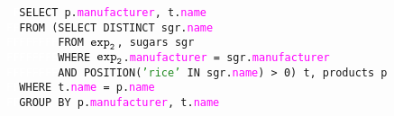 \newcommand{\sqlcolor}[1]{\textcolor{Bittersweet}{#1}}
\newcommand{\fieldcolor}[1]{\textcolor{Fuchsia}{#1}}
\newcommand{\strcolor}[1]{\textcolor{ForestGreen}{#1}}
\newcommand{\numcolor}[1]{\textcolor{TealBlue}{#1}}

\begin{figure}[h]
    \texttt{
    \textcolor{white}{F}\sqlcolor{SELECT} p.\fieldcolor{manufacturer}, t.\fieldcolor{name}\\
    \textcolor{white}{FF}\sqlcolor{FROM} (\sqlcolor{SELECT DISTINCT} sgr.\fieldcolor{name} \\
    \textcolor{white}{FFFFFFFF}\sqlcolor{FROM} $\texttt{exp}\sb\texttt{2}$, sugars sgr\\
    \textcolor{white}{FFFFFFFF}\sqlcolor{WHERE} $\texttt{exp}\sb\texttt{2}$.\fieldcolor{manufacturer} = sgr.\fieldcolor{manufacturer}\\
    \textcolor{white}{FFFFFFFF}\sqlcolor{AND POSITION}(\strcolor{'rice'} \sqlcolor{IN} sgr.\fieldcolor{name}) > \numcolor{0}) t, products p\\
    \textcolor{white}{FF}\sqlcolor{WHERE} t.\fieldcolor{name} = p.\fieldcolor{name} \\ 
    \textcolor{white}{FF}\sqlcolor{GROUP BY} p.\fieldcolor{manufacturer}, t.\fieldcolor{name}
    }
\end{figure}